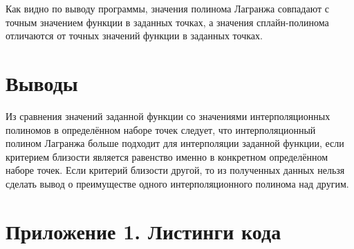 Как видно по выводу программы, значения полинома Лагранжа совпадают с точным значением функции в заданных точках, а значения сплайн-полинома отличаются от точных значений функции в заданных точках.

\section{Выводы}
Из сравнения значений заданной функции со значениями интерполяционных полиномов в определённом наборе точек следует, что интерполяционный полином Лагранжа больше подходит для интерполяции заданной функции, если критерием близости является равенство именно в конкретном определённом наборе точек. Если критерий близости другой, то из полученных данных нельзя сделать вывод о преимуществе одного интерполяционного полинома над другим.

\section*{Приложение 1. Листинги кода} \label{sec:appendix1}


\parindent=1cm %


\parindent=1cm %


\parindent=1cm %


\parindent=1cm %


\parindent=1cm %


